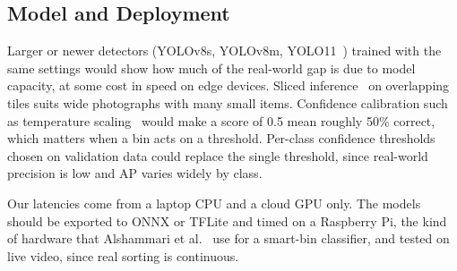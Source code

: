 \subsection{Model and Deployment}
\label{subsec:fw-model}

Larger or newer detectors (YOLOv8s, YOLOv8m, YOLO11~\cite{jocher2024yolo11}) trained with the same settings would show how much of the real-world gap is due to model capacity, at some cost in speed on edge devices. Sliced inference~\cite{akyon2022slicing} on overlapping tiles suits wide photographs with many small items. Confidence calibration such as temperature scaling~\cite{guo2017calibration} would make a score of 0.5 mean roughly 50\% correct, which matters when a bin acts on a threshold. Per-class confidence thresholds chosen on validation data could replace the single threshold, since real-world precision is low and AP varies widely by class.

Our latencies come from a laptop CPU and a cloud GPU only. The models should be exported to ONNX or TFLite and timed on a Raspberry Pi, the kind of hardware that Alshammari et al.~\cite{alshammari2025smart} use for a smart-bin classifier, and tested on live video, since real sorting is continuous.

